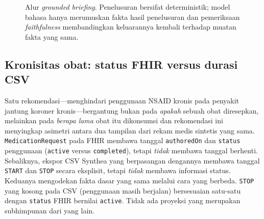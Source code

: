 \begin{figure}[htbp]
\centering
{}
\caption{Alur \emph{grounded briefing}. Penelusuran bersifat deterministik; model bahasa hanya
merumuskan fakta hasil penelusuran dan pemeriksaan \emph{faithfulness} membandingkan
keluarannya kembali terhadap muatan fakta yang sama.}
\label{fig:briefing-pipeline}
\end{figure}

\subsection{Kronisitas obat: status FHIR versus durasi CSV}
\label{sec:chronicity}
Satu rekomendasi---menghindari penggunaan NSAID kronis pada penyakit jantung koroner
kronis---bergantung bukan pada \emph{apakah} sebuah obat diresepkan, melainkan pada
\emph{berapa lama} obat itu dikonsumsi dan rekomendasi ini menyingkap asimetri
antara dua tampilan dari rekam medis sintetis yang sama. \texttt{MedicationRequest} pada FHIR membawa tanggal \texttt{authoredOn} dan \texttt{status}
penggunaan (\texttt{active} versus \texttt{completed}), tetapi \emph{tidak} membawa tanggal
berhenti. Sebaliknya, ekspor CSV Synthea yang berpasangan dengannya membawa tanggal
\texttt{START} dan \texttt{STOP} secara eksplisit, tetapi \emph{tidak} membawa informasi
status. Keduanya mengodekan fakta dasar yang sama melalui cara
yang berbeda. \texttt{STOP} yang kosong pada CSV (penggunaan masih berjalan) bersesuaian satu-satu
dengan \texttt{status} FHIR bernilai \texttt{active}. Tidak ada proyeksi yang merupakan
subhimpunan dari yang lain.

